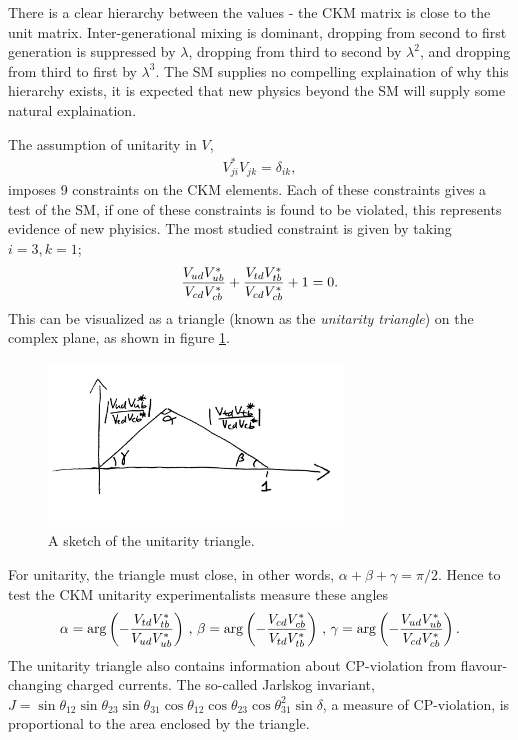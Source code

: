 There is a clear hierarchy between the values - the CKM matrix is close to the unit matrix. Inter-generational mixing is dominant, dropping from second to first generation is suppressed by $\lambda$, dropping from third to second by $\lambda^2$, and dropping from third to first by $\lambda^3$. The SM supplies no compelling explaination of why this hierarchy exists, it is expected that new physics beyond the SM will supply some natural explaination.

The assumption of unitarity in $V$,
\begin{align}
  V_{ji}^*V_{jk}=\delta_{ik},
  \label{eq:CKMunitarity}
\end{align}
imposes 9 constraints on the CKM elements. Each of these constraints gives a test of the SM, if one of these constraints is found to be violated, this represents evidence of new phyisics. The most studied constraint is given by taking $i=3,k=1$;
\begin{align}
  {V_{ud}V_{ub}^*\over V_{cd} V_{cb}^*} + {V_{td}V_{tb}^* \over V_{cd}V_{cb}^*} + 1 = 0.
\end{align}
This can be visualized as a triangle (known as the {\it{unitarity triangle}}) on the complex plane, as shown in figure \ref{fig:unitaritytriangle_sketch}.

\begin{figure}
  \vspace{-10pt}
  \begin{center}
    \includegraphics[width=0.7\textwidth]{images/unitaritytriangle_sketch.jpg}
  \end{center}
  \vspace{-40pt}
  \caption{A sketch of the unitarity triangle.}
  \label{fig:unitaritytriangle_sketch}
\end{figure}

For unitarity, the triangle must close, in other words, $\alpha+\beta+\gamma = \pi/2$. Hence to test the CKM unitarity experimentalists measure these angles
\begin{align}
  \alpha = \arg \left( -{V_{td}V_{tb}^*\over V_{ud}V_{ub}^*}\right) \,,\,
  \beta = \arg \left( -{V_{cd}V_{cb}^*\over V_{td}V_{tb}^*} \right) \,,\,
  \gamma = \arg \left( -{V_{ud}V_{ub}^*\over V_{cd}V_{cb}^*} \right).
\end{align}
The unitarity triangle also contains information about CP-violation from flavour-changing charged currents. The so-called Jarlskog invariant, $J=\sin\theta_{12}\sin\theta_{23}\sin\theta_{31}\cos\theta_{12}\cos\theta_{23}\cos\theta_{31}^2\sin\delta$, a measure of CP-violation, is proportional to the area enclosed by the triangle.

